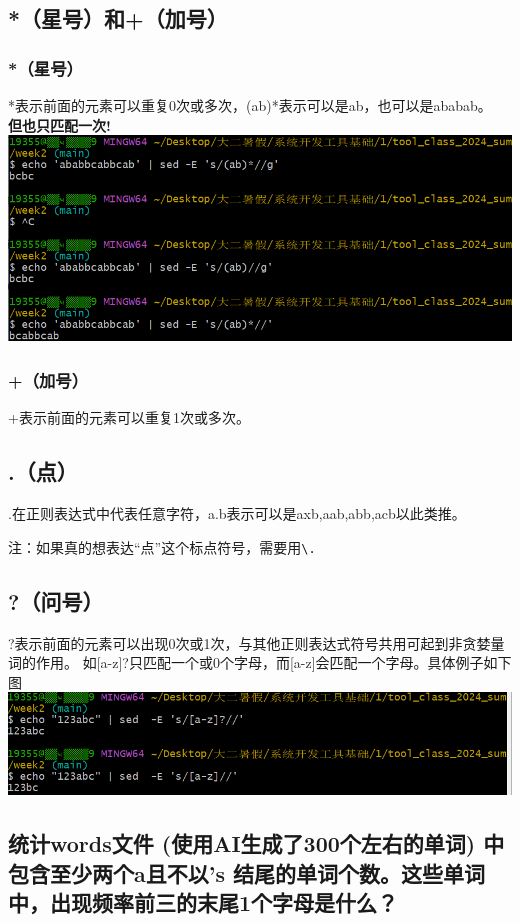 \documentclass[UTF8,a4paper]{ctexart}
\begin{document}
\subsection{*（星号）和+（加号）}
\subsubsection{*（星号）}
*表示前面的元素可以重复0次或多次，(ab)*表示可以是ab，也可以是ababab。\\
\textbf{但也只匹配一次!}\\
\includegraphics[width=1\textwidth]{./pictures/星号.png}
\subsubsection{+（加号）}
+表示前面的元素可以重复1次或多次。
\subsection{.（点）}
.在正则表达式中代表任意字符，a.b表示可以是axb,aab,abb,acb以此类推。\par
注：如果真的想表达“点”这个标点符号，需要用\verb|\.|
\subsection{?（问号）}
?表示前面的元素可以出现0次或1次，与其他正则表达式符号共用可起到非贪婪量词的作用。
如[a-z]?只匹配一个或0个字母，而[a-z]会匹配一个字母。具体例子如下图\\
\includegraphics[width=1\textwidth]{./pictures/问号.png}

\subsection{统计words文件 (使用AI生成了300个左右的单词) 中包含至少两个a且不以's 结尾的单词个数。这些单词中，出现频率前三的末尾1个字母是什么？}
\end{document}
